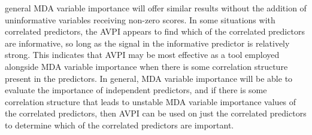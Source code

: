 \documentclass[12pt,twoside]{reedthesis}
\theoremstyle{definition}
\theoremstyle{definition}
\theoremstyle{definition}
\theoremstyle{remark}
\begin{document}
general MDA variable importance will offer similar results without the
addition of uninformative variables receiving non-zero scores. In some
situations with correlated predictors, the AVPI appears to find which of
the correlated predictors are informative, so long as the signal in the
informative predictor is relatively strong. This indicates that AVPI may
be most effective as a tool employed alongside MDA variable importance
when there is some correlation structure present in the predictors. In
general, MDA variable importance will be able to evaluate the importance
of independent predictors, and if there is some correlation structure
that leads to unstable MDA variable importance values of the correlated
predictors, then AVPI can be used on just the correlated predictors to
determine which of the correlated predictors are important. \par 
\end{document}
